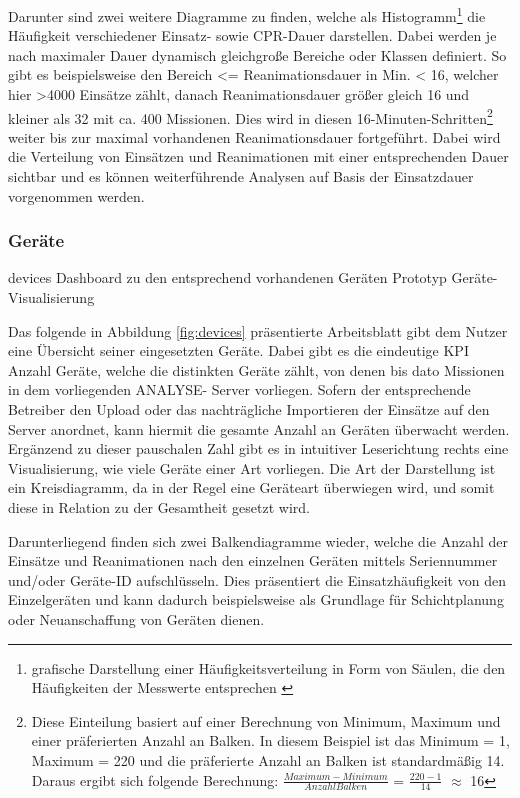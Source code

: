 Darunter sind zwei weitere Diagramme zu finden, welche als Histogramm\footnote{\glqq grafische Darstellung einer Häufigkeitsverteilung in Form von Säulen, die den Häufigkeiten der Messwerte entsprechen\grqq{} \cite{Dudenredaktion.2015}} die Häufigkeit verschiedener Einsatz- sowie \gls{CPR}-Dauer darstellen.
Dabei werden je nach maximaler Dauer dynamisch gleichgroße Bereiche oder \glqq Klassen\grqq{} definiert.
So gibt es beispielsweise den Bereich  <= Reanimationsdauer in Min. < 16\grqq{}, welcher hier >4000 Einsätze zählt, danach Reanimationsdauer größer gleich 16 und kleiner als 32 mit ca. 400 Missionen.
Dies wird in diesen 16-Minuten-Schritten\footnote{Diese Einteilung basiert auf einer Berechnung von Minimum, Maximum und einer präferierten Anzahl an Balken.
In diesem Beispiel ist das Minimum = 1, Maximum = 220 und die präferierte Anzahl an Balken ist standardmäßig 14.
Daraus ergibt sich folgende Berechnung: $\frac{Maximum-Minimum}{Anzahl Balken}$ = $\frac{220-1}{14}$ $\approx$ 16}
 weiter bis zur maximal vorhandenen Reanimationsdauer fortgeführt.
Dabei wird die Verteilung von Einsätzen und Reanimationen mit einer entsprechenden Dauer sichtbar und es können weiterführende Analysen auf Basis der Einsatzdauer vorgenommen werden.

\subsubsection{Geräte}
\label{subsub:geräte}
\bildbreit
{devices}
{Dashboard zu den entsprechend vorhandenen Geräten}
{Prototyp Geräte-Visualisierung}

Das folgende in Abbildung \ref{fig:devices} präsentierte Arbeitsblatt gibt dem Nutzer eine Übersicht seiner eingesetzten Geräte.
Dabei gibt es die eindeutige \gls{KPI} \glqq Anzahl Geräte\grqq{}, welche die distinkten Geräte zählt, von denen bis dato Missionen in dem vorliegenden \gls{ANALYSE}- Server vorliegen.
Sofern der entsprechende Betreiber den Upload oder das nachträgliche Importieren der Einsätze auf den Server anordnet, kann hiermit die gesamte Anzahl an Geräten überwacht werden. %
Ergänzend zu dieser pauschalen Zahl gibt es in intuitiver Leserichtung rechts eine Visualisierung, wie viele Geräte einer Art vorliegen.
Die Art der Darstellung ist ein Kreisdiagramm, da in der Regel eine Geräteart überwiegen wird, und somit diese in Relation zu der Gesamtheit gesetzt wird.

Darunterliegend finden sich zwei Balkendiagramme wieder, welche die Anzahl der Einsätze und Reanimationen nach den einzelnen Geräten mittels Seriennummer und/oder Geräte-ID aufschlüsseln.
Dies präsentiert die Einsatzhäufigkeit von den Einzelgeräten und kann dadurch beispielsweise als Grundlage für Schichtplanung oder Neuanschaffung von Geräten dienen.


